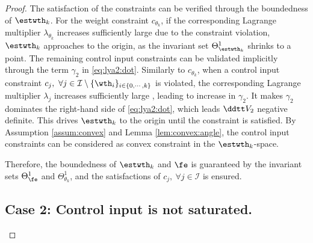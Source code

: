\documentclass[lettersize,journal]{IEEEtran}
\begin{document}
\begin{proof}
The satisfaction of the constraints can be verified through the boundedness of $\estwth_k$.
For the weight constraint $c_{\theta_k}$, if the corresponding Lagrange multiplier $\lambda_{\theta_k}$ \color{red}increases sufficiently large\color{black}  due to the constraint violation, $\estwth_k$ approaches to the origin, as the invariant set $\Theta_{\estwth_k}^{1}$ shrinks to a point.
The remaining control input constraints can be validated implicitly through the term ${\gamma}_2$ in \eqref{eq:lya2:dot}.
Similarly to $c_{\theta_k}$, when a control input constraint $c_j,\ \forall j\in\mathcal{I}\setminus \{\wth_i\}_{i\in\{0,\cdots,k\}}$ is violated, the corresponding Lagrange multiplier $\lambda_j$ increases sufficiently large , leading to increase in ${\gamma}_2$.
It makes ${\gamma}_2$ dominates the right-hand side of \eqref{eq:lya2:dot}, which leads $\ddtt V_2$ negative definite.
This drives $\estwth_k$ to the origin until the constraint is satisfied.
By Assumption \ref{assum:convex} and Lemma \ref{lem:convex:angle}, the control input constraints can be considered as convex constraint in the $\estwth_k$-space.

Therefore, the boundedness of $\estwth_k$ and $\fe$ is guaranteed by the invariant sets $\Theta_{\fe}^{1}$ and $\Theta_{\theta_k}^{1}$, and the satisfactions of $c_j,\ \forall j\in\mathcal{I}$ is ensured.

\subsection*{Case 2: Control input is not saturated.}


\end{proof}
\end{document}

